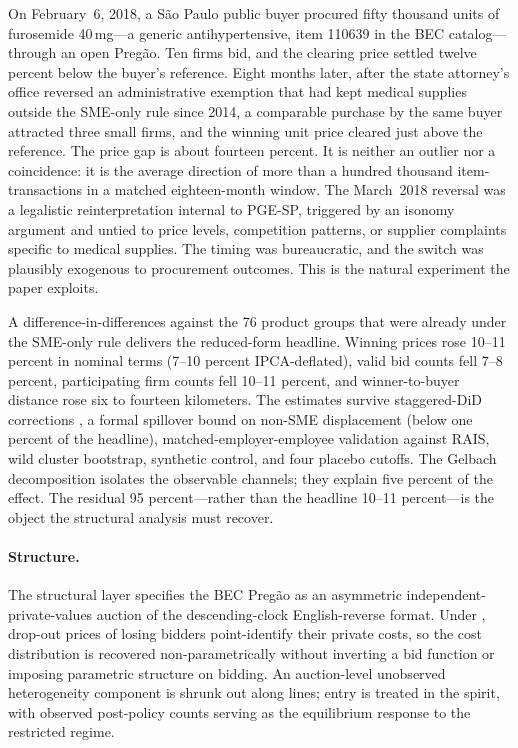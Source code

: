 On February~6, 2018, a S\~ao Paulo public buyer procured fifty thousand units of furosemide 40\,mg---a generic antihypertensive, item 110639 in the BEC catalog---through an open Preg\~ao. Ten firms bid, and the clearing price settled twelve percent below the buyer's reference. Eight months later, after the state attorney's office reversed an administrative exemption that had kept medical supplies outside the SME-only rule since 2014, a comparable purchase by the same buyer attracted three small firms, and the winning unit price cleared just above the reference. The price gap is about fourteen percent. It is neither an outlier nor a coincidence: it is the average direction of more than a hundred thousand item-transactions in a matched eighteen-month window. The March~2018 reversal was a legalistic reinterpretation internal to PGE-SP, triggered by an isonomy argument and untied to price levels, competition patterns, or supplier complaints specific to medical supplies. The timing was bureaucratic, and the switch was plausibly exogenous to procurement outcomes. This is the natural experiment the paper exploits.

A difference-in-differences against the 76 product groups that were already under the SME-only rule delivers the reduced-form headline. Winning prices rose 10--11 percent in nominal terms (7--10 percent IPCA-deflated), valid bid counts fell 7--8 percent, participating firm counts fell 10--11 percent, and winner-to-buyer distance rose six to fourteen kilometers. The estimates survive staggered-DiD corrections \citep{callaway2021, sun2021, goodmanbacon2021, borusyak2024}, a formal spillover bound on non-SME displacement (below one percent of the headline), matched-employer-employee validation against RAIS, wild cluster bootstrap, synthetic control, and four placebo cutoffs. The Gelbach decomposition isolates the observable channels; they explain five percent of the effect. The residual 95 percent---rather than the headline 10--11 percent---is the object the structural analysis must recover.

\paragraph{Structure.} The structural layer specifies the BEC Preg\~ao as an asymmetric independent-private-values auction of the descending-clock English-reverse format. Under \citet{haile2003}, drop-out prices of losing bidders point-identify their private costs, so the cost distribution is recovered non-parametrically without inverting a bid function or imposing parametric structure on bidding. An auction-level unobserved heterogeneity component is shrunk out along \citet{krasnokutskaya2011} lines; entry is treated in the \citet{atheyseira2011} spirit, with observed post-policy counts serving as the equilibrium response to the restricted regime.

